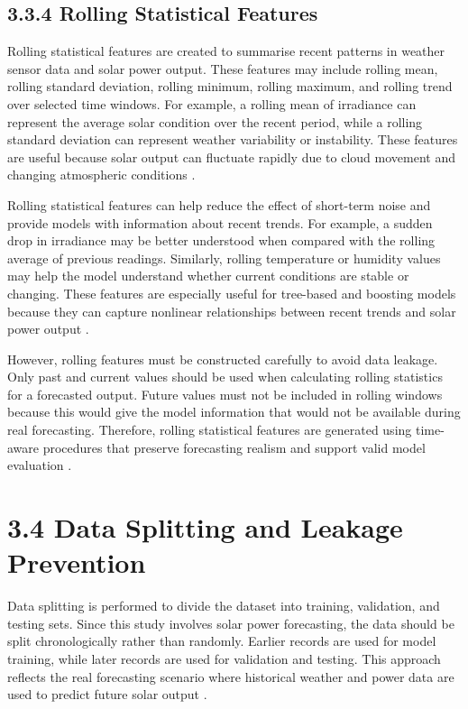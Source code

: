 \subsection{3.3.4 Rolling Statistical Features}

Rolling statistical features are created to summarise recent patterns in weather sensor data and solar power output. These features may include rolling mean, rolling standard deviation, rolling minimum, rolling maximum, and rolling trend over selected time windows. For example, a rolling mean of irradiance can represent the average solar condition over the recent period, while a rolling standard deviation can represent weather variability or instability. These features are useful because solar output can fluctuate rapidly due to cloud movement and changing atmospheric conditions \parencite{Pongphaw2025, CarvalhoJunior2025, Eren2025}.

Rolling statistical features can help reduce the effect of short-term noise and provide models with information about recent trends. For example, a sudden drop in irradiance may be better understood when compared with the rolling average of previous readings. Similarly, rolling temperature or humidity values may help the model understand whether current conditions are stable or changing. These features are especially useful for tree-based and boosting models because they can capture nonlinear relationships between recent trends and solar power output \parencite{JnanaVarshitha2025, Bakht2025, TsaiLo2025}.

However, rolling features must be constructed carefully to avoid data leakage. Only past and current values should be used when calculating rolling statistics for a forecasted output. Future values must not be included in rolling windows because this would give the model information that would not be available during real forecasting. Therefore, rolling statistical features are generated using time-aware procedures that preserve forecasting realism and support valid model evaluation \parencite{Duvuru2026, ArellanosTafur2025, Ma2025}.

\section{3.4 Data Splitting and Leakage Prevention}

Data splitting is performed to divide the dataset into training, validation, and testing sets. Since this study involves solar power forecasting, the data should be split chronologically rather than randomly. Earlier records are used for model training, while later records are used for validation and testing. This approach reflects the real forecasting scenario where historical weather and power data are used to predict future solar output \parencite{Eren2025, TsaiLo2025, Duvuru2026}.

